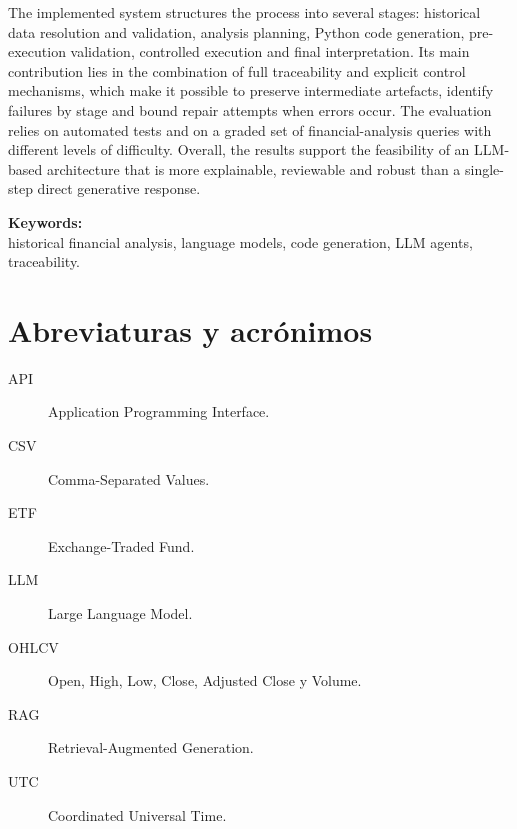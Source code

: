 \documentclass[12pt,a4paper]{report}
\begin{document}
The implemented system structures the process into several stages: historical data resolution and validation, analysis planning, Python code generation, pre-execution validation, controlled execution and final interpretation. Its main contribution lies in the combination of full traceability and explicit control mechanisms, which make it possible to preserve intermediate artefacts, identify failures by stage and bound repair attempts when errors occur. The evaluation relies on automated tests and on a graded set of financial-analysis queries with different levels of difficulty. Overall, the results support the feasibility of an LLM-based architecture that is more explainable, reviewable and robust than a single-step direct generative response.

\vspace{0.5cm}
\noindent\textbf{Keywords:}\\
historical financial analysis, language models, code generation, LLM agents, traceability.
\clearpage

\tableofcontents
\listoftables
\listoffigures
\chapter*{Abreviaturas y acr\'onimos}
\begin{description}
\item[API] Application Programming Interface.
\item[CSV] Comma-Separated Values.
\item[ETF] Exchange-Traded Fund.
\item[LLM] Large Language Model.
\item[OHLCV] Open, High, Low, Close, Adjusted Close y Volume.
\item[RAG] Retrieval-Augmented Generation.
\item[UTC] Coordinated Universal Time.
\end{description}

\clearpage
{}













\appendix

\end{document}
